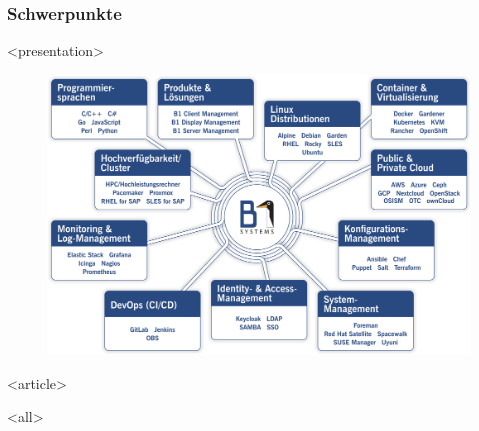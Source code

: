 \begin{frame}[fragile]
\frametitle<presentation>{Schwerpunkte}


\mode
<presentation>

\begin{figure}
\includegraphics[height=.85\textheight]{images/schwerpunktthemen}
\end{figure}


\mode
<article>

\mode
<all>

\end{frame}
\newpage

\clearpage

